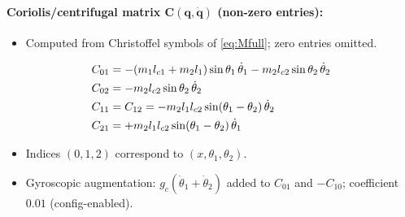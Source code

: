 \documentclass[10pt, a4paper]{article}
\newcommand{\vq}{\boldsymbol{q}}
\newcommand{\Cq}{\mathbf{C}(\vq,\dot{\vq})}
\begin{document}
\paragraph{Coriolis/centrifugal matrix $\Cq$ (non-zero entries):}
\begin{itemize}[leftmargin=1.5em,itemsep=0.2em]
  \item Computed from Christoffel symbols of \eqref{eq:Mfull}; zero entries omitted.
\end{itemize}
\begin{align}
  C_{01} &= -(m_1 l_{c1} + m_2 l_1)\sin\theta_1\,\dot{\theta}_1
             - m_2 l_{c2}\sin\theta_2\,\dot{\theta}_2 \notag\\
  C_{02} &= -m_2 l_{c2}\sin\theta_2\,\dot{\theta}_2 \notag\\
  C_{11} &= C_{12} = -m_2 l_1 l_{c2}\sin(\theta_1-\theta_2)\,\dot{\theta}_2 \notag\\
  C_{21} &= +m_2 l_1 l_{c2}\sin(\theta_1-\theta_2)\,\dot{\theta}_1
  \label{eq:Cfull}
\end{align}
\begin{itemize}[leftmargin=1.5em,itemsep=0.2em]
  \item Indices $(0,1,2)$ correspond to $(x,\theta_1,\theta_2)$.
  \item Gyroscopic augmentation: $g_c(\dot{\theta}_1+\dot{\theta}_2)$ added to
  $C_{01}$ and $-C_{10}$; coefficient $0.01$ (config-enabled).
\end{itemize}
\end{document}

